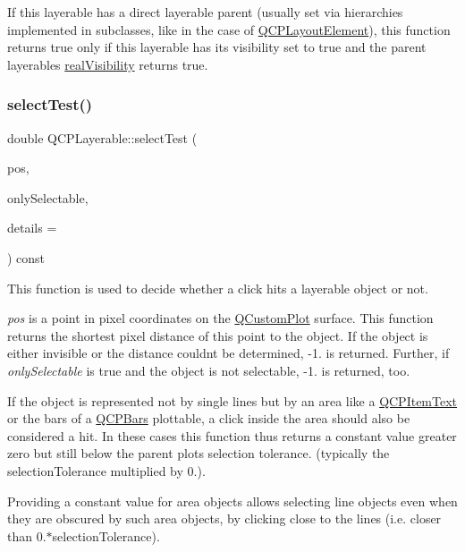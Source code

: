 If this layerable has a direct layerable parent (usually set via hierarchies implemented in subclasses, like in the case of \hyperlink{class_q_c_p_layout_element}{Q\+C\+P\+Layout\+Element}), this function returns true only if this layerable has its visibility set to true and the parent layerable\textquotesingle{}s \hyperlink{class_q_c_p_layerable_ab054e88f15d485defcb95e7376f119e7}{real\+Visibility} returns true. \mbox{\label{class_q_c_p_layerable_a04db8351fefd44cfdb77958e75c6288e}} 
\subsubsection{\texorpdfstring{select\+Test()}{selectTest()}}
{\footnotesize\ttfamily double Q\+C\+P\+Layerable\+::select\+Test (\begin{DoxyParamCaption}\item[{const Q\+PointF \&}]{pos,  }\item[{bool}]{only\+Selectable,  }\item[{Q\+Variant $\ast$}]{details = {} }\end{DoxyParamCaption}) const\hspace{0.3cm}{\ttfamily [virtual]}}

This function is used to decide whether a click hits a layerable object or not.

{\itshape pos} is a point in pixel coordinates on the \hyperlink{class_q_custom_plot}{Q\+Custom\+Plot} surface. This function returns the shortest pixel distance of this point to the object. If the object is either invisible or the distance couldn\textquotesingle{}t be determined, -\/1. is returned. Further, if {\itshape only\+Selectable} is true and the object is not selectable, -\/1. is returned, too.

If the object is represented not by single lines but by an area like a \hyperlink{class_q_c_p_item_text}{Q\+C\+P\+Item\+Text} or the bars of a \hyperlink{class_q_c_p_bars}{Q\+C\+P\+Bars} plottable, a click inside the area should also be considered a hit. In these cases this function thus returns a constant value greater zero but still below the parent plot\textquotesingle{}s selection tolerance. (typically the selection\+Tolerance multiplied by 0.).

Providing a constant value for area objects allows selecting line objects even when they are obscured by such area objects, by clicking close to the lines (i.\+e. closer than 0.$\ast$selection\+Tolerance).

